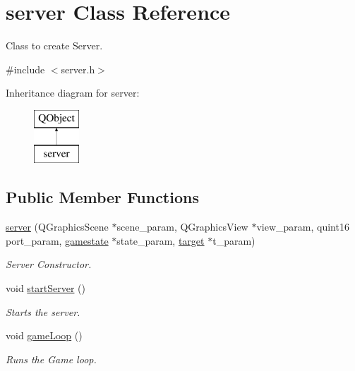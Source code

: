 \hypertarget{classserver}{}\section{server Class Reference}
\label{classserver}


Class to create Server.  




{\ttfamily \#include $<$server.\+h$>$}

Inheritance diagram for server\+:\begin{figure}[H]
\begin{center}
\leavevmode
\includegraphics[height=2.000000cm]{classserver}
\end{center}
\end{figure}
\subsection*{Public Member Functions}
\begin{DoxyCompactItemize}
\item 
\hyperlink{classserver_a78f26aa936c3bf529e53d97d39842700}{server} (Q\+Graphics\+Scene $\ast$scene\+\_\+param, Q\+Graphics\+View $\ast$view\+\_\+param, quint16 port\+\_\+param, \hyperlink{classgamestate}{gamestate} $\ast$state\+\_\+param, \hyperlink{classtarget}{target} $\ast$t\+\_\+param)
\begin{DoxyCompactList}\small\item\em Server Constructor. \end{DoxyCompactList}\item 
\mbox{\label{classserver_a4f2787ad7f4f65d5b010d0292a06c2d1}} 
void \hyperlink{classserver_a4f2787ad7f4f65d5b010d0292a06c2d1}{start\+Server} ()
\begin{DoxyCompactList}\small\item\em Starts the server. \end{DoxyCompactList}\item 
\mbox{\label{classserver_abae49f99fc3cc4a1490d66fb7ad7885e}} 
void \hyperlink{classserver_abae49f99fc3cc4a1490d66fb7ad7885e}{game\+Loop} ()
\begin{DoxyCompactList}\small\item\em Runs the Game loop. \end{DoxyCompactList}\end{DoxyCompactItemize}


